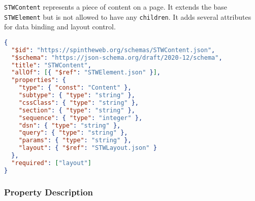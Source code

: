 	\texttt{STWContent} represents a piece of content on a page. It extends the base \texttt{STWElement} but is not allowed to have any \texttt{children}. It adds several attributes for data binding and layout control.

\begin{lstlisting}[language=JSON,caption={STWContent Schema Definition}]
{
  "$id": "https://spintheweb.org/schemas/STWContent.json",
  "$schema": "https://json-schema.org/draft/2020-12/schema",
  "title": "STWContent",
  "allOf": [{ "$ref": "STWElement.json" }],
  "properties": {
    "type": { "const": "Content" },
    "subtype": { "type": "string" },
    "cssClass": { "type": "string" },
    "section": { "type": "string" },
    "sequence": { "type": "integer" },
    "dsn": { "type": "string" },
    "query": { "type": "string" },
    "params": { "type": "string" },
    "layout": { "$ref": "STWLayout.json" }
  },
  "required": ["layout"]
}
\end{lstlisting}

\subsubsection{Property Description}

